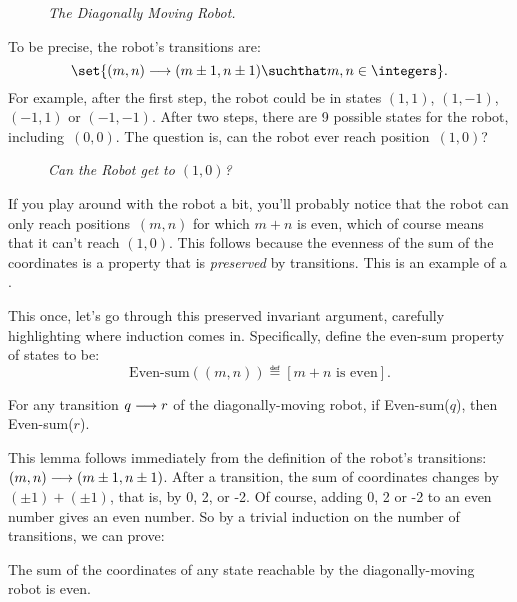 \begin{figure}
\caption{\em The Diagonally Moving Robot.}
\label{fig:diagrobot}
\end{figure}

To be precise, the robot's transitions are:
\[
\set{(m,n)\movesto (m\pm 1, n\pm 1) \suchthat m,n \in \integers}.
\]
For example, after the first step, the robot could be in states $(1,
1)$, $(1, -1)$, $(-1, 1)$ or $(-1, -1)$.  After two steps, there are
9 possible states for the robot, including~$(0, 0)$.
The question is, can the robot ever reach position~$(1, 0)$?

\begin{figure}
\caption{\em Can the Robot get to $(1,0)$?}
\label{fig:robot-to10}
\end{figure}

If you play around with the robot a bit, you'll probably notice that
the robot can only reach positions~$(m, n)$ for which $m + n$ is even,
which of course means that it can't reach $(1,0)$.  This follows
because the evenness of the sum of the coordinates is a property that
is \emph{preserved} by transitions.  This is an example of a
.

This once, let's go through this preserved invariant argument,
carefully highlighting where induction comes in.  Specifically, define
the even-sum property of states to be:
\[
\text{Even-sum}((m,n)) \eqdef [m+n \text{ is even}].
\]
\begin{lemma}\label{even-sum-invar}
For any transition $q \mathrel{\longrightarrow} r$ of the diagonally-moving robot, if
Even-sum($q$), then Even-sum($r$).
\end{lemma}
This lemma follows immediately from the definition of the robot's
transitions: $(m,n)\mathrel{\longrightarrow} (m\pm 1, n\pm 1)$.  After a transition,
the sum of coordinates changes by $(\pm 1) + (\pm 1)$, that is, by 0,
2, or -2.  Of course, adding 0, 2 or -2 to an even number gives an
even number.  So by a trivial induction on the number of transitions,
we can prove:
\begin{theorem}\label{th:diag-robot}
The sum of the coordinates of any state reachable by the
diagonally-moving robot is even.
\end{theorem}

